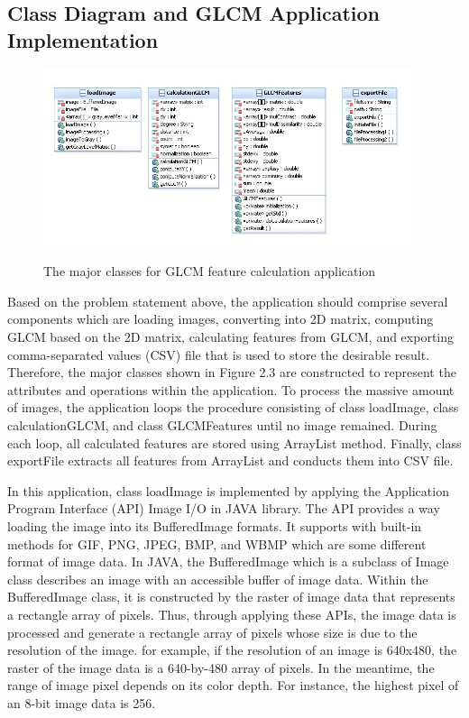 \subsection{Class Diagram and GLCM Application Implementation}
\begin{figure}[!h]
\begin{center}
\includegraphics[width=4.25in]{class_diagram}
\end{center}
\renewcommand{\baselinestretch}{1}
\small\normalsize
\begin{quote}
\caption{The major classes for GLCM feature calculation application}
\label{fig2.2}
\end{quote}
\end{figure}
\renewcommand{\baselinestretch}{2}
\small\normalsize
Based on the problem statement above, the application should comprise several components which are loading images, converting into 2D matrix, computing GLCM based on the 2D matrix, calculating features from GLCM, and exporting comma-separated values (CSV) file that is used to store the desirable result. Therefore, the major classes shown in Figure 2.3 are constructed to represent the attributes and operations within the application. To process the massive amount of images, the application loops the procedure consisting of class loadImage, class calculationGLCM, and class GLCMFeatures until no image remained. During each loop, all calculated features are stored using ArrayList method. Finally, class exportFile extracts all features from ArrayList and conducts them into CSV file.\par
In this application, class loadImage is implemented by applying the Application Program Interface (API) Image I/O in JAVA library. The API provides a way loading the image into its BufferedImage formats. It supports with built-in methods for GIF, PNG, JPEG, BMP, and WBMP which are some different format of image data. In JAVA, the BufferedImage which is a subclass of Image class describes an image with an accessible buffer of image data. Within the BufferedImage class, it is constructed by the raster of image data that represents a rectangle array of pixels. Thus, through applying these APIs, the image data is processed and generate a rectangle array of pixels whose size is due to the resolution of the image. for example, if the resolution of an image is 640x480, the raster of the image data is a 640-by-480 array of pixels. In the meantime, the range of image pixel depends on its color depth. For instance, the highest pixel of an 8-bit image data is 256. \par
